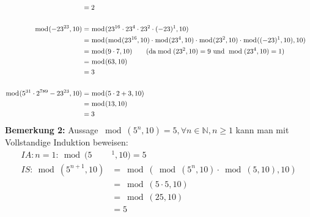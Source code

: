 \begin{enumerate}[label=(\alph*)]
\begin{align*}
			\\&= 2 \\\\
			\bmod(-23^{23},10) &= \bmod(23^{16}\cdot23^{4}\cdot23^{2}\cdot(-23)^1,10) 
			\\&= \bmod(\bmod(23^{16},10)\cdot\bmod(23^{4},10)\cdot\bmod(23^{2},10)\cdot\bmod((-23)^1,10),10)
			\\&= \bmod(9\cdot 7, 10) \textrm{\qquad (da} \bmod(23^2,10)=9 \textrm{ und }\bmod(23^4,10)=1)
			\\&= \bmod(63,10) 
			\\&= 3 \\\\
			\bmod(5^{31} \cdot 2^{789}-23^{23}, 10) &= \bmod(5 \cdot 2 + 3,10)	
			\\&= \bmod(13,10) 
			\\&= 3
		\end{align*}
		\textbf{Bemerkung 2:} Aussage $\bmod(5^n,10)=5, \forall n \in \mathbb{N}, n\geq1$ kann man mit Vollstandige Induktion beweisen:
		\begin{align*}
			IA: n=1: \bmod(5&^1,10)=5 \\ %
			IS: \bmod(5^{n+1},10)&=\bmod(\bmod(5^n,10)\cdot\bmod(5,10),10) \\&= \bmod(5\cdot5,10) \\&= \bmod(25,10) \\&= 5
		\end{align*}


\end{enumerate}
